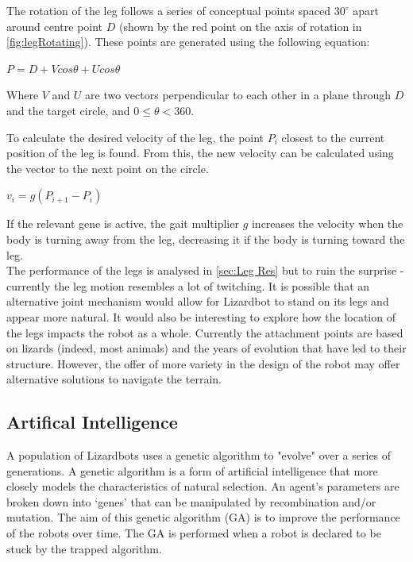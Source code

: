 \documentclass{article}
\begin{document}
The rotation of the leg follows a series of conceptual points spaced $30^\circ$ apart around centre point $D$ (shown by the red point on the axis of rotation in \autoref{fig:legRotating}). These points are generated using the following equation:
\begin{center}
\begin{Large}
$P = D + Vcos\theta + Ucos\theta$\\
\end{Large}
\end{center}

Where $V$ and $U$ are two vectors perpendicular to each other in a plane through $D$ and the target circle, and $0\leq\theta<360$. 
 
To calculate the desired velocity of the leg, the point $P_i$ closest to the current position of the leg is found. From this, the new velocity can be calculated using the vector to the next point on the circle.   
\begin{center}
\begin{Large}
$v_{i} = g(P_{i + 1} - P_{i})$
\end{Large}
\end{center}

If the relevant gene is active, the gait multiplier $g$ increases the velocity when the body is turning away from the leg, decreasing it if the body is turning toward the leg.\\

The performance of the legs is analysed in \ref{sec:Leg Res} but to ruin the surprise - currently the leg motion resembles a lot of twitching. It is possible that an alternative joint mechanism would allow for Lizardbot to stand on its legs and appear more natural. It would also be interesting to explore how the location of the legs impacts the robot as a whole. Currently the attachment points are based on lizards (indeed, most animals) and the years of evolution that have led to their structure. However, the offer of more variety in the design of the robot may offer alternative solutions to navigate the terrain. 


\subsection{Artifical Intelligence}
\label{sec:AI Imp}
A population of Lizardbots uses a genetic algorithm to "evolve" over a series of generations. A genetic algorithm is a form of artificial intelligence that more closely models the characteristics of natural selection. An agent’s parameters are broken down into ‘genes’ that can be manipulated by recombination and/or mutation. The aim of this genetic algorithm (GA) is to improve the performance of the robots over time. The GA is performed when a robot is declared to be stuck by the trapped algorithm. 
\end{document}
